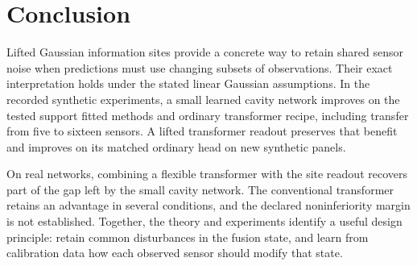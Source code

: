 \section{Conclusion}
\label{sec:conclusion}

Lifted Gaussian information sites provide a concrete way to retain shared sensor noise when predictions must use changing subsets of observations. Their exact interpretation holds under the stated linear Gaussian assumptions. In the recorded synthetic experiments, a small learned cavity network improves on the tested support fitted methods and ordinary transformer recipe, including transfer from five to sixteen sensors. A lifted transformer readout preserves that benefit and improves on its matched ordinary head on new synthetic panels.

On real networks, combining a flexible transformer with the site readout recovers part of the gap left by the small cavity network. The conventional transformer retains an advantage in several conditions, and the declared noninferiority margin is not established. Together, the theory and experiments identify a useful design principle: retain common disturbances in the fusion state, and learn from calibration data how each observed sensor should modify that state.
